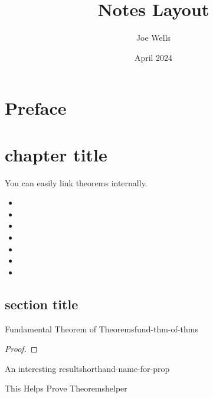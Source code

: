 \documentclass{book}
\title{Notes Layout}
\author{Joe Wells}
\date{April 2024}
\theoremstyle{definition}
\theoremstyle{remark}
\begin{document}
\raggedright

\frontmatter

\maketitle

\newpage

\tableofcontents

\newpage

\chapter{Preface}

\lipsum[1-2]

\newpage

\mainmatter

\chapter{chapter title}

You can easily link theorems internally.
\begin{itemize}
\item {}
\item {}
\item {}
\item {}
\item {}
\item {}
\item {}
\end{itemize}

\section{section title}

\begin{thm}{Fundamental Theorem of Theorems}{fund-thm-of-thms}
  \lipsum[1-1]
\end{thm}

\begin{proof}
  \lipsum[2-3]
\end{proof}

\begin{prop}{An interesting result}{shorthand-name-for-prop}
  \lipsum[4-4]
\end{prop}

\begin{lem}{This Helps Prove Theorems}{helper}
  \lipsum[5-5]
\end{lem}
\end{document}
